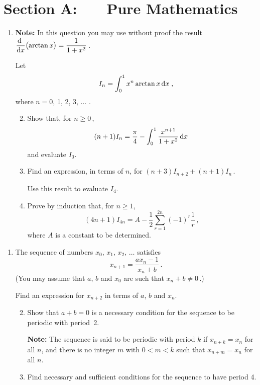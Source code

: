 \documentclass[a4, 11pt]{report}
\newlength{\qspace}
\newcounter{qnumber}
\newenvironment{question}%
 {\vspace{\qspace}
  \begin{enumerate}[\bfseries 1\quad][10]%
    \setcounter{enumi}{\value{qnumber}}%
    \item%
 }
{
  \end{enumerate}
  \filbreak
  \stepcounter{qnumber}
 }
\newenvironment{questionparts}[1][1]%
 {
  \begin{enumerate}[\bfseries (i)]%
    \setcounter{enumii}{#1}
    \addtocounter{enumii}{-1}
    \setlength{\itemsep}{2mm}
    \setlength{\parskip}{5pt}
 }
 {
  \end{enumerate}
 }
\def\d{{\rm d}}
\def\ge{\geqslant}
\begin{document}
\setcounter{page}{2}

 
\section*{Section A: \ \ \ Pure Mathematics}

\begin{question}
{\bf Note: } In this question
you may use without proof the result
$ \dfrac{\d \ }{\d x}\big(\!\arctan x \big) = \dfrac 1 {1+x^2}\,$.

\vspace{3mm}
Let
\[
I_n = \int_0^1 x^n \arctan x \, \d x \;,
\]
where $n=0$, 1, 2, 3, $\ldots$ . 

\begin{questionparts}  
\item
 Show that, for $n\ge0\,$, 
\[
(n+1)  I_n = \frac \pi 4  - 
\int _0^1 \frac {x^{n+1}}{1+x^2} \, \d x
\, 
\]
and evaluate $I_0$.
\item
Find an expression, in terms of $n$, 
for $(n+3)I_{n+2}+(n+1)I_{n}\,$.

Use this result to evaluate $I_4$.
\item
Prove by induction that, for $n\ge1$, 
\[
 (4n+1) I_{4n} 
=A   - \frac12 \sum_{r=1}^{2n} (-1)^r \frac 1 {r}
\,,
\]
where $A$ is a constant to be determined.

\end{questionparts}

 
\end{question}

\begin{question}
The sequence of numbers $x_0$, $x_1$, $x_2$, $\ldots$ satisfies 
\[
x_{n+1} = \frac{ax_n-1}{x_n+b}
\,.
\]
(You may assume that $a$, $b$ and $x_0$ are such that $x_n+b\ne0\,$.)
 
Find an expression for $x_{n+2}$ in terms of $a$, $b$  and $x_n$.

\begin{questionparts}
\item
 Show that $a+b=0$ is a necessary condition for 
the sequence to be periodic with period~2. 

{\bf Note: } The sequence is said to  be 
 periodic with period $k$ if $x_{n+k} = x_n$ for all $n$,
and there is no integer $m$ with $0<m<k$ such that   $x_{n+m} = x_n$
for all $n$.

\item Find  necessary and sufficient conditions for the sequence to have
period 4. 
\end{questionparts}
\end{question}
\end{document}
